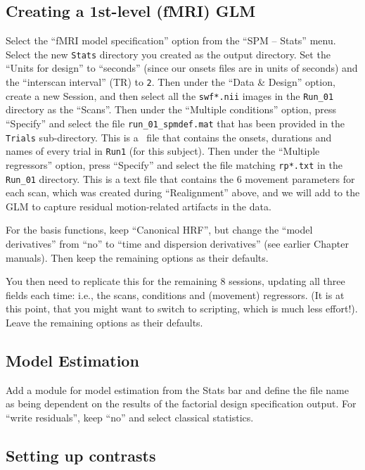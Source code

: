 \subsection{Creating a 1st-level (fMRI) GLM}

Select the ``fMRI model specification'' option from the ``SPM -- Stats'' menu. Select the new \texttt{Stats} directory you created as the output directory. Set the ``Units for design'' to ``seconds'' (since our onsets files are in units of seconds) and the ``interscan interval'' (TR) to \texttt{2}. Then under the ``Data \& Design'' option, create a new Session, and then select all the \texttt{swf*.nii} images in the \texttt{Run\_01} directory as the ``Scans''. Then under the ``Multiple conditions'' option, press ``Specify'' and select the file \texttt{run\_01\_spmdef.mat} that has been provided in the \texttt{Trials} sub-directory. This is a \matlab\ file that contains the onsets, durations and names of every trial in \texttt{Run1} (for this subject). Then under the ``Multiple regressors'' option, press ``Specify'' and select the file matching \texttt{rp*.txt} in the \texttt{Run\_01} directory. This is a text file that contains the 6 movement parameters for each scan, which was created during ``Realignment'' above, and we will add to the GLM to capture residual motion-related artifacts in the data.

For the basis functions, keep ``Canonical HRF'', but change the ``model derivatives'' from ``no'' to ``time and dispersion derivatives'' (see earlier Chapter manuals). Then keep the remaining options as their defaults.

You then need to replicate this for the remaining 8 sessions, updating all three fields each time: i.e., the scans, conditions and (movement) regressors. (It is at this point, that you might want to switch to scripting, which is much less effort!). Leave the remaining options as their defaults.

\subsection{Model Estimation}

Add a module for model estimation from the Stats bar and define the file name as being dependent on the results of the factorial design specification output. For ``write residuals'', keep ``no'' and select classical statistics.

\subsection{Setting up contrasts}

